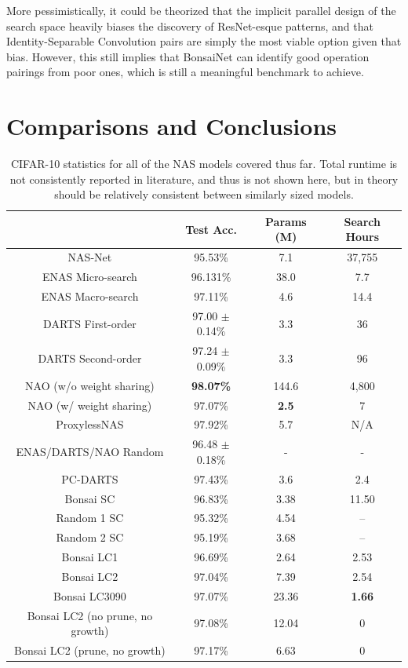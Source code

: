 More pessimistically, it could be theorized that the implicit parallel design of the search space heavily biases the discovery
of ResNet-esque patterns, and that Identity-Separable Convolution pairs are simply the most viable option given that bias.
However, this still implies that BonsaiNet can identify good operation pairings from poor ones, which is still a meaningful
benchmark to achieve.

\section{Comparisons and Conclusions}
\begin{table}[ht!]
\begin{center}
\begin{tabular}{c|c|c|c}
 & Test Acc. & Params (M) & Search Hours\\
\hline
NAS-Net                     & 95.53\% 	                    & 7.1   		& 37,755 \\
ENAS Micro-search	        & 96.131\%            		    & 38.0  		& 7.7     \\
ENAS Macro-search		    & 97.11\%            		    & 4.6   		& 14.4    \\
DARTS First-order     	    & 97.00 $\pm$ 0.14\% 		    & 3.3   		& 36      \\
DARTS Second-order     	    & 97.24 $\pm$ 0.09\% 		    & 3.3   		& 96 \\
NAO (w/o weight sharing)    & \textbf{98.07\%} 	            & 144.6 		& 4,800 \\
NAO (w/ weight sharing)     & 97.07\%        	            & \textbf{2.5}  & 7 \\
ProxylessNAS                & 97.92\%                       & 5.7           & N/A           \\
ENAS/DARTS/NAO Random	  	& 96.48 $\pm$ 0.18\%			& -				& -\\
PC-DARTS                    & 97.43\%   	                & 3.6           & 2.4 \\
 \hline
Bonsai SC						& 96.83\% & 3.38 	& 11.50 \\
Random 1 SC						& 95.32\% & 4.54 	& -- \\
Random 2 SC						& 95.19\% & 3.68 	& -- \\
Bonsai LC1				 		& 96.69\% & 2.64 	& 2.53 \\
Bonsai LC2						& 97.04\% & 7.39	& 2.54 \\
Bonsai LC3090					& 97.07\% & 23.36 	& \textbf{1.66} \\
Bonsai LC2 (no prune, no growth)& 97.08\% & 12.04	& 0\\
Bonsai LC2 (prune, no growth)	& 97.17\% & 6.63   	& 0\\
\end{tabular}
\end{center}
\caption[CIFAR-10 statistics for all of the NAS models covered thus far, including BonsaiNet]{CIFAR-10 statistics for all of the NAS models covered thus far.
Total runtime is not consistently reported
in literature, and thus is not shown here, but in theory should be relatively consistent between similarly sized models.}
\label{tab:bonsai_comp_performance}
\end{table}

